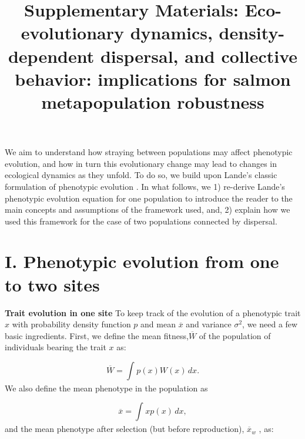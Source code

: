 \documentclass{revtex4}
\begin{document}
\title{Supplementary Materials: Eco-evolutionary dynamics, density-dependent dispersal, and collective behavior: implications for salmon metapopulation robustness}
\maketitle

We aim to understand how straying between populations may affect phenotypic evolution, and how in turn this evolutionary change may lead to changes in ecological dynamics as they unfold. 
To do so, we build upon Lande's classic formulation of phenotypic evolution \citep{Lande:1976ga}. In what follows, we  
1) re-derive Lande's phenotypic evolution equation for one population to introduce the reader to the main concepts and assumptions of the framework used, and,
2) explain how we used this framework for the case of two populations connected by dispersal.

\section*{I. Phenotypic evolution from one to two sites}

\textbf{Trait evolution in one site} To keep track of the evolution of a phenotypic trait $x$ with probability density function $p$ and mean $\overline{x}$ and variance $\sigma^{2}$, we need a few basic ingredients. First, we define the mean fitness,$\overline{W}$ of the population of individuals bearing the trait $x$ as:

\begin{equation}\label{1}
\overline{W}=\int_{} p(x)W(x)\,dx.
\end{equation}
We also define the mean phenotype in the population as  

\begin{equation}\label{2}
\overline{x}=\int_{} xp(x)\,dx,
\end{equation}
and the mean phenotype after selection (but before reproduction), $\overline{x}_{w}$ \cite{Falconer:1967tg}, as:
\end{document}
